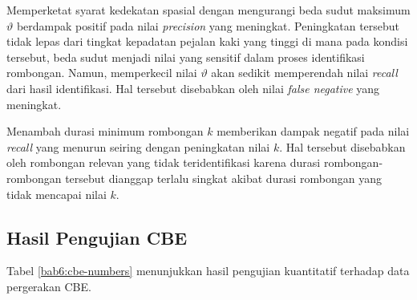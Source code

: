 Memperketat syarat kedekatan spasial dengan mengurangi beda sudut maksimum $\vartheta$ berdampak positif pada nilai \textit{precision} yang meningkat. Peningkatan tersebut tidak lepas dari tingkat kepadatan pejalan kaki yang tinggi di mana pada kondisi tersebut, beda sudut menjadi nilai yang sensitif dalam proses identifikasi rombongan. Namun, memperkecil nilai $\vartheta$ akan sedikit memperendah nilai \textit{recall} dari hasil identifikasi. Hal tersebut disebabkan oleh nilai \textit{false negative} yang meningkat.

Menambah durasi minimum rombongan $k$ memberikan dampak negatif pada nilai \textit{recall} yang menurun seiring dengan peningkatan nilai $k$. Hal tersebut disebabkan oleh rombongan relevan yang tidak teridentifikasi karena durasi rombongan-rombongan tersebut dianggap terlalu singkat akibat durasi rombongan yang tidak mencapai nilai $k$.  

\subsection{Hasil Pengujian CBE}
\label{subsec:cbe-result}

Tabel \ref{bab6:cbe-numbers} menunjukkan hasil pengujian kuantitatif terhadap data pergerakan CBE.

